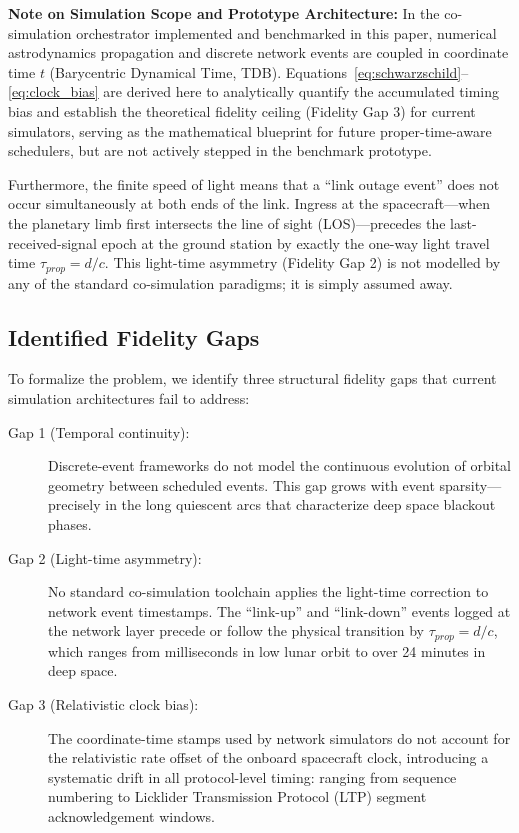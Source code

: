 \documentclass[a4paper,fleqn]{cas-sc}
\begin{document}
\noindent\textbf{Note on Simulation Scope and Prototype Architecture:} In the co-simulation orchestrator implemented and benchmarked in this paper, numerical astrodynamics propagation and discrete network events are coupled in coordinate time $t$ (Barycentric Dynamical Time, TDB). Equations~\eqref{eq:schwarzschild}--\eqref{eq:clock_bias} are derived here to analytically quantify the accumulated timing bias and establish the theoretical fidelity ceiling (Fidelity Gap 3) for current simulators, serving as the mathematical blueprint for future proper-time-aware schedulers, but are not actively stepped in the benchmark prototype.

Furthermore, the finite speed of light means that a ``link outage event'' does not occur simultaneously at both ends of the link. Ingress at the spacecraft---when the planetary limb first intersects the line of sight (LOS)---precedes the last-received-signal epoch at the ground station by exactly the one-way light travel time $\tau_{prop} = d/c$. This light-time asymmetry (Fidelity Gap 2) is not modelled by any of the standard co-simulation paradigms; it is simply assumed away.

\subsection{Identified Fidelity Gaps}
To formalize the problem, we identify three structural fidelity gaps that current simulation architectures fail to address:

\begin{description}
    \item[Gap 1 (Temporal continuity):] Discrete-event frameworks do not model the continuous evolution of orbital geometry between scheduled events. This gap grows with event sparsity---precisely in the long quiescent arcs that characterize deep space blackout phases.
    \item[Gap 2 (Light-time asymmetry):] No standard co-simulation toolchain applies the light-time correction to network event timestamps. The ``link-up'' and ``link-down'' events logged at the network layer precede or follow the physical transition by $\tau_{prop} = d/c$, which ranges from milliseconds in low lunar orbit to over 24 minutes in deep space.
    \item[Gap 3 (Relativistic clock bias):] The coordinate-time stamps used by network simulators do not account for the relativistic rate offset of the onboard spacecraft clock, introducing a systematic drift in all protocol-level timing: ranging from sequence numbering to Licklider Transmission Protocol (LTP) segment acknowledgement windows.
\end{description}
\end{document}
